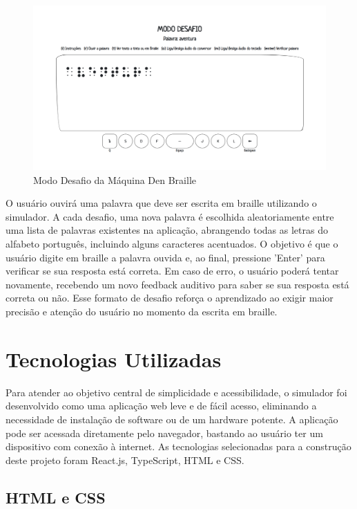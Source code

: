 \begin{figure}[h]
    \centering
    \includegraphics[scale=0.3]{ch06/assets/modo-desafio.png}
    \decoRule
    \caption[Modo Desafio]{Modo Desafio da Máquina Den Braille}
    \label{fig:ch06-Modo Desafio}
\end{figure}

O usuário ouvirá uma palavra que deve ser escrita em braille utilizando o simulador. A cada desafio, uma nova palavra é escolhida aleatoriamente entre uma lista de palavras existentes na aplicação, abrangendo todas as letras do alfabeto português, incluindo alguns caracteres acentuados. O objetivo é que o usuário digite em braille a palavra ouvida e, ao final, pressione 'Enter' para verificar se sua resposta está correta. Em caso de erro, o usuário poderá tentar novamente, recebendo um novo feedback auditivo para saber se sua resposta está correta ou não. Esse formato de desafio reforça o aprendizado ao exigir maior precisão e atenção do usuário no momento da escrita em braille.

\section{Tecnologias Utilizadas}

Para atender ao objetivo central de simplicidade e acessibilidade, o simulador foi desenvolvido como uma aplicação web leve e de fácil acesso, eliminando a necessidade de instalação de software ou de um hardware potente. A aplicação pode ser acessada diretamente pelo navegador, bastando ao usuário ter um dispositivo com conexão à internet. As tecnologias selecionadas para a construção deste projeto foram React.js, TypeScript, HTML e CSS.

\subsection{HTML e CSS}

